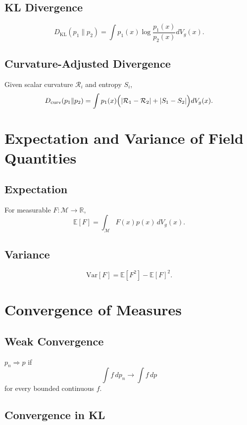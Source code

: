 \subsection{KL Divergence}

\[
D_{\mathrm{KL}}(p_1\|p_2)
  = \int p_1(x) \log \frac{p_1(x)}{p_2(x)} dV_g(x).
\]

\subsection{Curvature-Adjusted Divergence}

Given scalar curvature $\mathcal{R}_i$ and entropy $S_i$,
\[
D_{\mathrm{curv}}(p_1\|p_2)
  = \int p_1(x)
      \Bigl(
        |\mathcal{R}_1 - \mathcal{R}_2| +
        |S_1 - S_2|
      \Bigr)
      dV_g(x).
\]

\section{Expectation and Variance of Field Quantities}

\subsection{Expectation}

For measurable $F:\mathcal{M}\to\mathbb{R}$,
\[
\mathbb{E}[F] = \int_{\mathcal{M}} F(x) p(x)\, dV_g(x).
\]

\subsection{Variance}

\[
\mathrm{Var}[F]
  = \mathbb{E}[F^2] - \mathbb{E}[F]^2.
\]

\section{Convergence of Measures}

\subsection{Weak Convergence}

$p_n \Rightarrow p$ if
\[
\int f\, dp_n \to \int f\, dp
\]
for every bounded continuous $f$.

\subsection{Convergence in KL}


